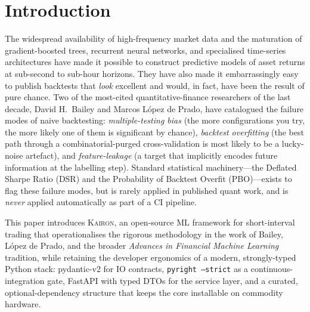 \documentclass[11pt,a4paper]{article}
\let\oldsection\section
\renewcommand{\section}{\clearpage\oldsection}
\providecommand{\kairon}{\textsc{Kairon}}
\providecommand{\dsr}{\textsc{DSR}}
\providecommand{\pbo}{\textsc{PBO}}
\begin{document}
\thispagestyle{plain}
\setcounter{tocdepth}{2}
\renewcommand{\contentsname}{\hfill\Large\bfseries Contents\hfill}
\tableofcontents
\clearpage

\setcounter{page}{1}
\pagestyle{plain}

\section{Introduction}\label{sec:intro}

The widespread availability of high-frequency market data and the
maturation of gradient-boosted trees, recurrent neural networks, and
specialised time-series architectures have made it possible to
construct predictive models of asset returns at sub-second to
sub-hour horizons. They have also made it embarrassingly easy to
publish backtests that \emph{look} excellent and would, in fact,
have been the result of pure chance. Two of the most-cited
quantitative-finance researchers of the last decade, David H.\ Bailey
and Marcos López de Prado, have catalogued the failure modes of
naive backtesting: \emph{multiple-testing bias} (the more
configurations you try, the more likely one of them is significant by
chance), \emph{backtest overfitting} (the best path through a
combinatorial-purged cross-validation is most likely to be a
lucky-noise artefact), and \emph{feature-leakage} (a target that
implicitly encodes future information at the labelling step).
Standard statistical machinery---the Deflated Sharpe Ratio (\dsr{}) and
the Probability of Backtest Overfit (\pbo{})---exists to flag these
failure modes, but is rarely applied in published quant work, and is
\emph{never} applied automatically as part of a CI pipeline.

This paper introduces \kairon{}, an open-source ML framework for
short-interval trading that operationalises the rigorous
methodology in the work of Bailey, López de Prado, and the broader
\emph{Advances in Financial Machine Learning} tradition, while
retaining the developer ergonomics of a modern, strongly-typed
Python stack: pydantic-v2 for IO contracts, \texttt{pyright --strict}
as a continuous-integration gate, FastAPI with typed DTOs for the
service layer, and a curated, optional-dependency structure that
keeps the core installable on commodity hardware.
\end{document}
